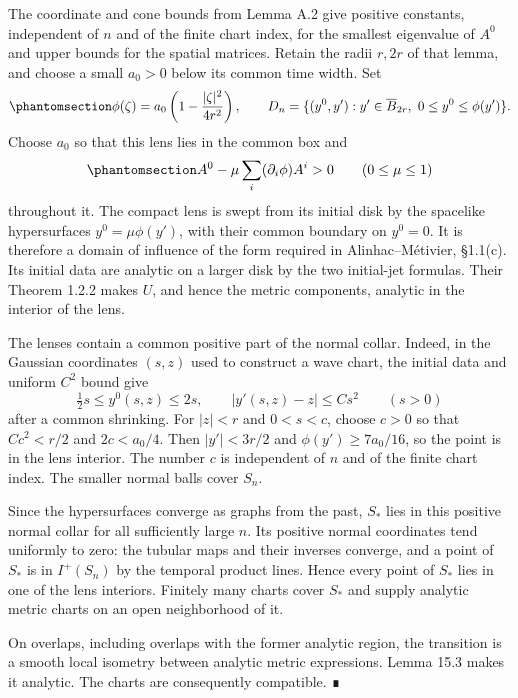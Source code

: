 \documentclass[
  english,
  11pt,
  reqno]{amsart}
\begin{document}
The coordinate and cone bounds from Lemma A.2 give positive constants,
independent of \(n\) and of the finite chart index, for the smallest
eigenvalue of \(A^0\) and upper bounds for the spatial matrices. Retain
the radii \(r,2r\) of that lemma, and choose a small \(a_0>0\) below its
common time width. Set
\begin{equation}\protect\phantomsection\label{eq:analytic-persistence-lens}{
\phi(\zeta)=a_0\left(1-\frac{|\zeta|^2}{4r^2}\right),
\qquad
D_n=\{(y^0,y'):y'\in\overline B_{2r},\ 0\le y^0\le\phi(y')\}.
}\end{equation} Choose \(a_0\) so that this lens lies in the common box
and
\begin{equation}\protect\phantomsection\label{eq:analytic-persistence-spacelike-sweep}{
A^0-\mu\sum_i(\partial_i\phi)A^i>0
\qquad (0\le\mu\le1)
}\end{equation} throughout it. The compact lens is swept from its
initial disk by the spacelike hypersurfaces \(y^0=\mu\phi(y')\), with
their common boundary on \(y^0=0\). It is therefore a domain of
influence of the form required in Alinhac--Métivier, §1.1(c). Its
initial data are analytic on a larger disk by the two initial-jet
formulas. Their Theorem 1.2.2 makes \(U\), and hence the metric
components, analytic in the interior of the lens.

The lenses contain a common positive part of the normal collar. Indeed,
in the Gaussian coordinates \((s,z)\) used to construct a wave chart,
the initial data and uniform \(C^2\) bound give \[
\tfrac12s\le y^0(s,z)\le2s,
\qquad
|y'(s,z)-z|\le Cs^2
\qquad (s>0)
\] after a common shrinking. For \(|z|<r\) and \(0<s<c\), choose \(c>0\)
so that \(Cc^2<r/2\) and \(2c<a_0/4\). Then \(|y'|<3r/2\) and
\(\phi(y')\ge7a_0/16\), so the point is in the lens interior. The number
\(c\) is independent of \(n\) and of the finite chart index. The smaller
normal balls cover \(S_n\).

Since the hypersurfaces converge as graphs from the past, \(S_*\) lies
in this positive normal collar for all sufficiently large \(n\). Its
positive normal coordinates tend uniformly to zero: the tubular maps and
their inverses converge, and a point of \(S_*\) is in \(I^+(S_n)\) by
the temporal product lines. Hence every point of \(S_*\) lies in one of
the lens interiors. Finitely many charts cover \(S_*\) and supply
analytic metric charts on an open neighborhood of it.

On overlaps, including overlaps with the former analytic region, the
transition is a smooth local isometry between analytic metric
expressions. Lemma 15.3 makes it analytic. The charts are consequently
compatible. ∎
\end{document}
